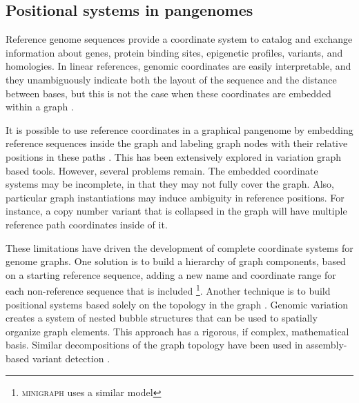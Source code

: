 \subsection{Positional systems in pangenomes}
\label{sec:positions}

Reference genome sequences provide a coordinate system to catalog and exchange information about genes, protein binding sites, epigenetic profiles, variants, and homologies.
In linear references, genomic coordinates are easily interpretable, and they unambiguously indicate both the layout of the sequence and the distance between bases, but this is not the case when these coordinates are embedded within a graph \cite{Rand_2017}.

It is possible to use reference coordinates in a graphical pangenome by embedding reference sequences inside the graph and labeling graph nodes with their relative positions in these paths \cite{Garrison_2018,Garrison_2019}.
This has been extensively explored in variation graph based tools.
However, several problems remain.
The embedded coordinate systems may be incomplete, in that they may not fully cover the graph.
Also, particular graph instantiations may induce ambiguity in reference positions.
For instance, a copy number variant that is collapsed in the graph will have multiple reference path coordinates inside of it.

These limitations have driven the development of complete coordinate systems for genome graphs.
One solution is to build a hierarchy of graph components, based on a starting reference sequence, adding a new name and coordinate range for each non-reference sequence that is included \cite{Rand_2017}\footnote{\textsc{minigraph} uses a similar model}.
Another technique is to build positional systems based solely on the topology in the graph \cite{paten2018superbubbles}.
Genomic variation creates a system of nested bubble structures that can be used to spatially organize graph elements.
This approach has a rigorous, if complex, mathematical basis.
Similar decompositions of the graph topology have been used in assembly-based variant detection \cite{Iqbal_2012, Onodera_2013}.


